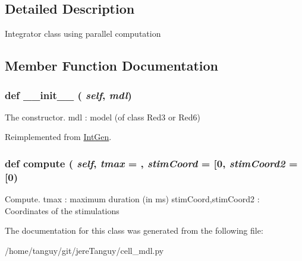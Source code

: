 \subsection{Detailed Description}
\begin{DoxyVerb}Integrator class using parallel computation\end{DoxyVerb}
 

\subsection{Member Function Documentation}
\hypertarget{classcell__mdl_1_1_int_para_ac775ee34451fdfa742b318538164070e}{
\subsubsection[{\_\-\_\-init\_\-\_\-}]{\setlength{\rightskip}{0pt plus 5cm}def \_\-\_\-init\_\-\_\- ( {\em self}, \/   {\em mdl})}}
\label{classcell__mdl_1_1_int_para_ac775ee34451fdfa742b318538164070e}
\begin{DoxyVerb}The constructor.
mdl : model (of class Red3 or Red6)
\end{DoxyVerb}
 

Reimplemented from \hyperlink{classcell__mdl_1_1_int_gen_ac775ee34451fdfa742b318538164070e}{IntGen}.

\hypertarget{classcell__mdl_1_1_int_para_aaa2084b96999fb1734fd2f330bfa01a6}{
\subsubsection[{compute}]{\setlength{\rightskip}{0pt plus 5cm}def compute ( {\em self}, \/   {\em tmax} = {}, \/   {\em stimCoord} = {\ttfamily \mbox{[}0}, \/   {\em stimCoord2} = {\ttfamily \mbox{[}0})}}
\label{classcell__mdl_1_1_int_para_aaa2084b96999fb1734fd2f330bfa01a6}
\begin{DoxyVerb}Compute.
tmax : maximum duration (in ms)
stimCoord,stimCoord2 : Coordinates of the stimulations
\end{DoxyVerb}
 

The documentation for this class was generated from the following file:\begin{DoxyCompactItemize}
\item 
/home/tanguy/git/jereTanguy/cell\_\-mdl.py\end{DoxyCompactItemize}
